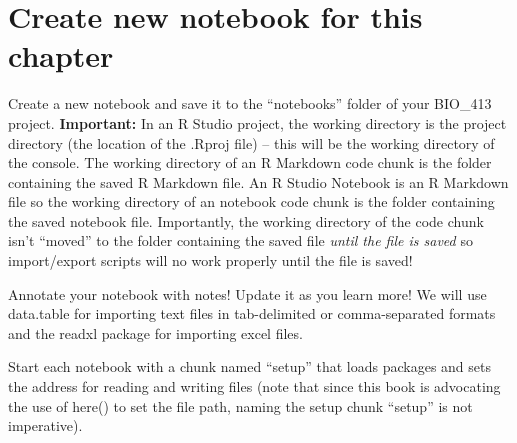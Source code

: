 \documentclass[]{book}
\newenvironment{Shaded}{\begin{snugshade}}{\end{snugshade}}
\newcommand{\KeywordTok}[1]{\textcolor[rgb]{0.13,0.29,0.53}{\textbf{#1}}}
\newcommand{\DataTypeTok}[1]{\textcolor[rgb]{0.13,0.29,0.53}{#1}}
\newcommand{\DecValTok}[1]{\textcolor[rgb]{0.00,0.00,0.81}{#1}}
\newcommand{\StringTok}[1]{\textcolor[rgb]{0.31,0.60,0.02}{#1}}
\newcommand{\CommentTok}[1]{\textcolor[rgb]{0.56,0.35,0.01}{\textit{#1}}}
\newcommand{\OperatorTok}[1]{\textcolor[rgb]{0.81,0.36,0.00}{\textbf{#1}}}
\newcommand{\NormalTok}[1]{#1}
\begin{document}
\section{Create new notebook for this
chapter}\label{create-new-notebook-for-this-chapter}

Create a new notebook and save it to the ``notebooks'' folder of your
BIO\_413 project. \textbf{Important:} In an R Studio project, the
working directory is the project directory (the location of the .Rproj
file) -- this will be the working directory of the console. The working
directory of an R Markdown code chunk is the folder containing the saved
R Markdown file. An R Studio Notebook is an R Markdown file so the
working directory of an notebook code chunk is the folder containing the
saved notebook file. Importantly, the working directory of the code
chunk isn't ``moved'' to the folder containing the saved file
\emph{until the file is saved} so import/export scripts will no work
properly until the file is saved!

Annotate your notebook with notes! Update it as you learn more! We will
use data.table for importing text files in tab-delimited or
comma-separated formats and the readxl package for importing excel
files.

Start each notebook with a chunk named ``setup'' that loads packages and
sets the address for reading and writing files (note that since this
book is advocating the use of here() to set the file path, naming the
setup chunk ``setup'' is not imperative).

\begin{Shaded}
\end{Shaded}
\end{document}
